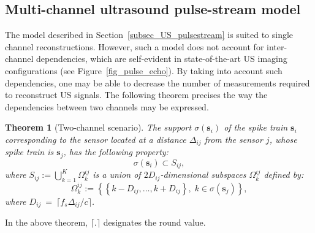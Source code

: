 \documentclass{article}
\newtheorem{theorem}{Theorem}
\newcommand{\vect}[1]{\bm{#1}}
\newcommand{\ser}[2]{#1^{#2}}
\theoremstyle{definition}
\begin{document}
\subsection{Multi-channel ultrasound pulse-stream model}
\label{subsec_US_multiplechannels}
The model described in Section~\ref{subsec_US_pulsestream} is suited to single channel reconstructions. However, such a model does not account for inter-channel dependencies, which are self-evident in state-of-the-art US imaging configurations (see Figure~\ref{fig_pulse_echo}). By taking into account such dependencies, one may be able to decrease the number of measurements required to reconstruct US signals.
The following theorem precises the way the dependencies between two channels may be expressed.
\begin{theorem}[Two-channel scenario]
\label{th_2sens_subspace}
The support $\sigma \left(\vect{s}_i\right)$ of the spike train $\vect{s}_i$ corresponding to the sensor located at a distance $\Delta_{ij}$ from the sensor $j$, whose spike train is $\vect{s}_j$, has the following property:
	\begin{equation*}
		\sigma \left(\vect{s}_i\right) \subset S_{ij},
	\end{equation*}
	where $S_{ij} := \bigcup \limits_{k=1}^K \ser{\Omega_k}{ij}$ is a union of $2 D_{ij}$-dimensional subspaces $\ser{\Omega_k}{ij}$ defined by: 
	\begin{equation*}
		\ser{\Omega_k}{ij} := \left \lbrace \left \lbrace k - D_{ij},\dots, k+ D_{ij} \right\rbrace, \; k \in \sigma \left(\vect{s}_{j}\right) \right\rbrace,
	\end{equation*}
	where $D_{ij}~=~\lceil f_s \Delta_{ij}/ c  \rceil$. 
\end{theorem}
In the above theorem, $\lceil.\rceil$ designates the round value.
\end{document}
